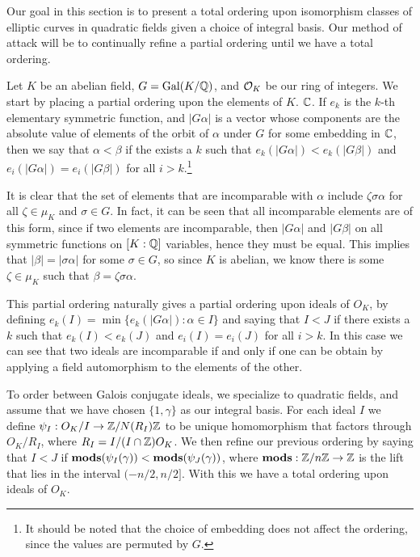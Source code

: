 Our goal in this section is to present a total ordering upon isomorphism
classes of elliptic curves in quadratic fields given a choice of integral
basis. Our method of attack will be to continually refine a partial ordering
until we have a total ordering.

Let $K$ be an abelian field, $G=\operatorname{Gal}(K/\mathbb{Q})$, and $\mathcal{O}_K$ be our ring of
integers. We start by placing a partial ordering upon the elements of $K$.
$\mathbb{C}$. If $e_k$ is the $k$-th elementary symmetric function, and $|G\alpha|$
is a vector whose components are the absolute value of elements of the orbit
of $\alpha$ under $G$ for some embedding in $\mathbb{C}$, then we say that $\alpha <
\beta$ if the exists a $k$ such that $e_k(|G\alpha|) < e_k(|G\beta|)$ and
$e_i(|G\alpha|) = e_i(|G\beta|)$ for all $i > k$.\footnote{It should be noted
that the choice of embedding does not affect the ordering, since the values are
permuted by $G$.} 

It is clear that the set of elements that are incomparable with $\alpha$
include $\zeta \sigma\alpha$ for all $\zeta\in\mu_K$ and $\sigma\in G$. In
fact, it can be seen that all incomparable elements are of this form, since if
two elements are incomparable, then $|G\alpha|$ and $|G\beta|$ on all symmetric
functions on $[K:\mathbb{Q}]$ variables, hence they must be equal. This implies that
$|\beta|=|\sigma\alpha|$ for some $\sigma\in G$, so since $K$ is abelian, we
know there is some $\zeta\in \mu_K$ such that $\beta = \zeta\sigma\alpha$.

This partial ordering naturally gives a partial ordering upon ideals of $O_K$,
by defining $e_k(I) = \min\{e_k(|G\alpha|) : \alpha \in I\}$ and saying that
$I < J$ if there exists a $k$ such that $e_k(I) < e_k(J)$ and $e_i(I) = e_i(J)$
for all $i > k$. In this case we can see that two ideals are incomparable if
and only if one can be obtain by applying a field automorphism to the elements
of the other.

To order between Galois conjugate ideals, we specialize to quadratic fields,
and assume that we have chosen $\{1,\gamma\}$ as our integral basis.
For each ideal $I$ we define $\psi_I:O_K/I \to \mathbb{Z}/N(R_I)\mathbb{Z}$ to be unique
homomorphism that factors through $O_K/R_I$, where $R_I = I/(I\cap \mathbb{Z})O_K$.
We then refine our previous ordering by saying that $I < J$ if 
$\operatorname{\textbf{mods}}(\psi_I(\gamma)) < \operatorname{\textbf{mods}}(\psi_J(\gamma))$, where $\operatorname{\textbf{mods}}:\mathbb{Z}/n\mathbb{Z}\to \mathbb{Z}$
is the lift that lies in the interval $(-n/2,n/2]$. With this we have a total
ordering upon ideals of $O_K$.


